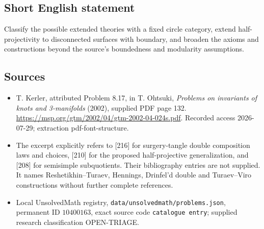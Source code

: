 \documentclass[11pt]{article}
\begin{document}
\subsection{Short English statement}
Classify the possible extended theories with a fixed circle category, extend half-projectivity to disconnected surfaces with boundary, and broaden the axioms and constructions beyond the source's boundedness and modularity assumptions.
\subsection{Sources}
\begin{itemize}
\item T. Kerler, attributed Problem 8.17, in T. Ohtsuki, \emph{Problems on invariants of knots and 3-manifolds} (2002), supplied PDF page 132. \url{https://msp.org/gtm/2002/04/gtm-2002-04-024s.pdf}. Recorded access 2026-07-29; extraction pdf-font-structure.
\item The excerpt explicitly refers to [216] for surgery-tangle double composition laws and choices, [210] for the proposed half-projective generalization, and [208] for semisimple subquotients. Their bibliography entries are not supplied. It names Reshetikhin--Turaev, Hennings, Drinfel'd double and Turaev--Viro constructions without further complete references.
\item Local UnsolvedMath registry, \texttt{data/unsolvedmath/problems.json}, permanent ID \(10400163\), exact source code \texttt{catalogue entry}; supplied research classification OPEN-TRIAGE.
\end{itemize}
\end{document}
